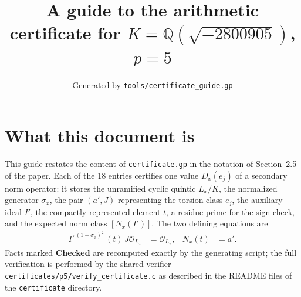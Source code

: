 \documentclass[11pt]{article}
\title{A guide to the arithmetic certificate for $K=\mathbb Q(\sqrt{-2800905})$, $p=5$}
\author{}
\date{Generated by \texttt{tools/certificate\_guide.gp}}
\begin{document}
\maketitle
\section*{What this document is}
This guide restates the content of \texttt{certificate.gp} in the
notation of Section~2.5 of the paper.  Each of the 18 entries
certifies one value $D_x(e_j)$ of a secondary norm operator: it
stores the unramified cyclic quintic $L_x/K$, the normalized
generator $\sigma_x$, the pair $(a',J)$ representing the torsion
class $e_j$, the auxiliary ideal $I'$, the compactly represented
element $t$, a residue prime for the sign check, and the expected
norm class $[N_x(I')]$.  The two defining equations are
\begin{align*}
I'^{\,(1-\sigma_x)^2}\,(t)\,J\mathcal O_{L_x}&=\mathcal O_{L_x},&
N_x(t)&=a'.
\end{align*}
Facts marked \textbf{Checked} are recomputed exactly by the
generating script; the full verification is performed by the
shared verifier \texttt{certificates/p5/verify\_certificate.c} as
described in the README files of the \texttt{certificate}
directory.
\end{document}
